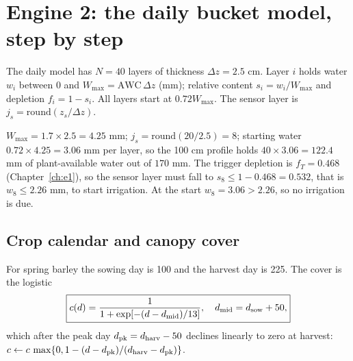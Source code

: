 \chapter{Engine 2: the daily bucket model, step by step}\label{ch:e2}

The daily model has $N=40$ layers of thickness $\Delta z=2.5$ cm. Layer $i$ holds water $w_i$ between $0$ and $W_{\max}=\mathrm{AWC}\,\Delta z$ (mm); relative content $s_i=w_i/W_{\max}$ and depletion $f_i=1-s_i$. All layers start at $0.72W_{\max}$. The sensor layer is $j_s=\mathrm{round}(z_s/\Delta z)$.

\sol  $W_{\max}=1.7\times2.5=4.25$ mm; $j_s=\mathrm{round}(20/2.5)=8$; starting water $0.72\times4.25=3.06$ mm per layer, so the 100 cm profile holds $40\times3.06=122.4$ mm of plant-available water out of $170$ mm. The trigger depletion is $f_T=0.468$ (Chapter~\ref{ch:e1}), so the sensor layer must fall to $s_8\le1-0.468=0.532$, that is $w_8\le2.26$ mm, to start irrigation. At the start $w_8=3.06>2.26$, so no irrigation is due.


\section{Crop calendar and canopy cover}
For spring barley the sowing day is 100 and the harvest day is 225. The cover is the logistic
\begin{equation}\boxed{c(d)=\frac{1}{1+\exp[-(d-d_{\rm mid})/13]},\quad d_{\rm mid}=d_{\rm sow}+50,}\end{equation}
which after the peak day $d_{\rm pk}=d_{\rm harv}-50$ declines linearly to zero at harvest: $c\leftarrow c\,\max\{0,1-(d-d_{\rm pk})/(d_{\rm harv}-d_{\rm pk})\}$.


